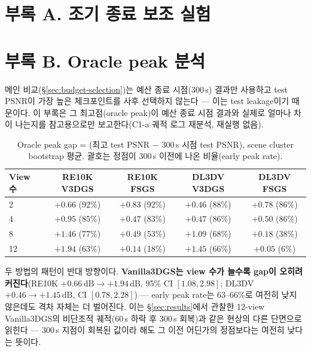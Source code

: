 \section*{부록 A. 조기 종료 보조 실험}
\label{sec:appendix-early-stop}


\section*{부록 B. Oracle peak 분석}
\label{sec:appendix-oracle-peak}

메인 비교(\S\ref{sec:budget-selection})는 예산 종료 시점(300\,s) 결과만 사용하고 test PSNR이 가장 높은 체크포인트를 사후 선택하지 않는다 — 이는 test leakage이기 때문이다. 이 부록은 그 최고점(oracle peak)이 예산 종료 시점 결과와 실제로 얼마나 차이 나는지를 참고용으로만 보고한다(C1-a 궤적 로그 재분석, 재실행 없음).

\begin{table}[t]
\centering
\caption{Oracle peak gap = (최고 test PSNR $-$ 300\,s 시점 test PSNR), scene cluster bootstrap 평균. 괄호는 정점이 300\,s 이전에 나온 비율(early peak rate).}
\label{tab:oracle-peak}
\small
\begin{tabular}{@{}l cccc@{}}
\toprule
View 수 & RE10K V3DGS & RE10K FSGS & DL3DV V3DGS & DL3DV FSGS \\
\midrule
2  & $+0.66$ (92\%) & $+0.83$ (92\%) & $+0.46$ (88\%) & $+0.78$ (86\%) \\
4  & $+0.95$ (85\%) & $+0.47$ (83\%) & $+0.47$ (86\%) & $+0.50$ (86\%) \\
8  & $+1.46$ (77\%) & $+0.49$ (53\%) & $+1.09$ (68\%) & $+0.18$ (38\%) \\
12 & $+1.94$ (63\%) & $+0.14$ (18\%) & $+1.45$ (66\%) & $+0.05$ (6\%) \\
\bottomrule
\end{tabular}
\end{table}

두 방법의 패턴이 반대 방향이다. \textbf{Vanilla3DGS는 view 수가 늘수록 gap이 오히려 커진다}(RE10K $+0.66\,\mathrm{dB} \to +1.94\,\mathrm{dB}$, 95\% CI $[1.08, 2.98]$; DL3DV $+0.46 \to +1.45\,\mathrm{dB}$, CI $[0.78, 2.28]$) — early peak rate는 63--66\%로 여전히 낮지 않은데도 격차 자체는 더 벌어진다. 이는 \S\ref{sec:results}에서 관찰한 12-view Vanilla3DGS의 비단조적 궤적(60\,s 하락 후 300\,s 회복)과 같은 현상의 다른 단면으로 읽힌다 — 300\,s 지점이 회복된 값이라 해도 그 이전 어딘가의 정점보다는 여전히 낮다는 뜻이다.

